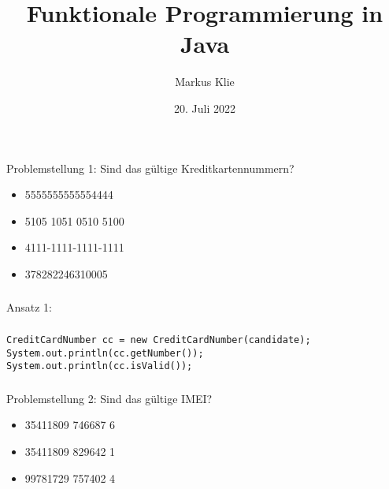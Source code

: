 \documentclass{beamer}
\title{Funktionale Programmierung in Java}
\author[M. Klie]{Markus Klie}
\date[20.07.2022]{20. Juli 2022}
\begin{document}
\begin{frame}
    \titlepage
\end{frame}

\begin{frame}
\frametitle{\insertpagenumber}
Problemstellung 1: Sind das gültige Kreditkartennummern\footnotemark?
\begin{itemize}
\item 5555555555554444
\item 5105 1051 0510 5100
\item 4111-1111-1111-1111
\item 378282246310005
\end{itemize}

\end{frame}

\begin{frame}
\frametitle{\insertpagenumber}
Ansatz 1:
\begin{center}
\end{center}
\end{frame}

\begin{frame}[fragile]
\frametitle{\insertpagenumber}
\begin{lstlisting}
CreditCardNumber cc = new CreditCardNumber(candidate);
System.out.println(cc.getNumber());
System.out.println(cc.isValid());
\end{lstlisting}
\end{frame}

\begin{frame}
\frametitle{\insertpagenumber}
Problemstellung 2: Sind das gültige IMEI\footnotemark?
\begin{itemize}
    \item 35411809 746687 6
    \item 35411809 829642 1
    \item 99781729 757402 4
\end{itemize}
\end{frame}
\end{document}
